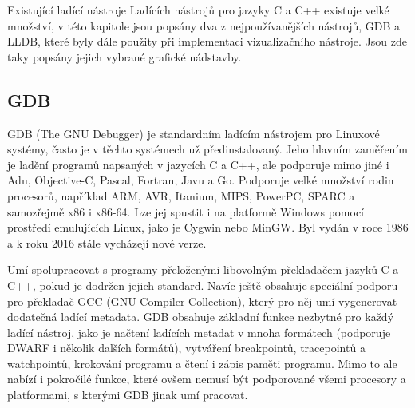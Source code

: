 \documentclass[bc,male,python,dept460]{diploma}						%
\begin{document}
\begin{section}{Existující ladící nástroje}
\label{sec:ExistingDebuggers}
	Ladících nástrojů pro jazyky C a C++ existuje velké množství, v této kapitole jsou popsány dva z nejpoužívanějších nástrojů, GDB a LLDB, které byly dále
	použity při implementaci vizualizačního nástroje. Jsou zde taky popsány jejich vybrané grafické nádstavby.

	\subsection{GDB}
		GDB (The GNU Debugger) je standardním ladícím nástrojem pro Linuxové systémy, často je v těchto systémech už předinstalovaný.
		Jeho hlavním zaměřením je ladění programů napsaných v jazycích C a C++, ale podporuje mimo jiné i Adu, Objective-C, Pascal, Fortran, Javu
		a Go\cite{gdb-languages}. Podporuje velké množství rodin procesorů, například ARM, AVR, Itanium, MIPS, PowerPC, SPARC a samozřejmě x86 i x86-64.
		Lze jej spustit i na platformě Windows pomocí prostředí emulujících Linux, jako je Cygwin nebo MinGW. Byl vydán v roce 1986 a k roku
		2016 stále vycházejí nové verze.
		
		\par Umí spolupracovat s programy přeloženými libovolným překladačem jazyků C a C++, pokud je dodržen jejich standard. Navíc ještě obsahuje
		speciální podporu pro překladač GCC (GNU Compiler Collection), který pro něj umí vygenerovat dodatečná ladící metadata.
		GDB obsahuje základní funkce nezbytné pro každý ladící nástroj, jako je načtení ladících metadat v mnoha formátech (podporuje DWARF i několik dalších
		formátů), vytváření breakpointů, tracepointů a watchpointů, krokování programu a čtení i zápis paměti programu.
		Mimo to ale nabízí i pokročilé funkce, které ovšem nemusí být podporované všemi procesory a platformami, s kterými GDB jinak umí pracovat.
		

\end{section}
\end{document}
